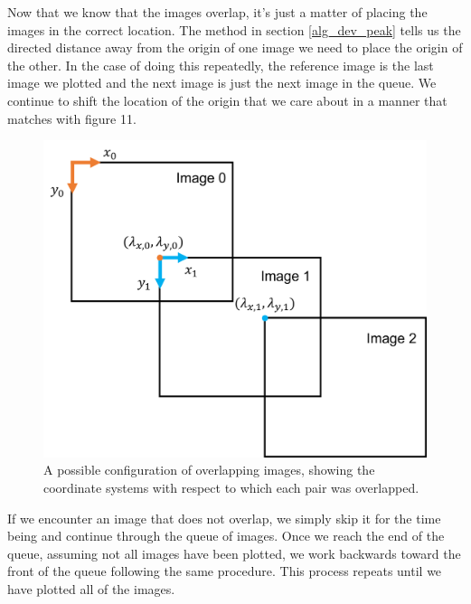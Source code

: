 \documentclass[]{article}
\begin{document}
Now that we know that the images overlap, it's just a matter of placing the images in the correct location. The method in section \ref{alg_dev_peak} tells us the directed distance away from the origin of one image we need to place the origin of the other. In the case of doing this repeatedly, the reference image is the last image we plotted and the next image is just the next image in the queue. We continue to shift the location of the origin that we care about in a manner that matches with figure 11.

\begin{figure}[H]
	\centering
	\label{coord_sys}
	\includegraphics[width=5in]{coord_sys.png}
	\caption{A possible configuration of overlapping images, showing the coordinate systems with respect to which each pair was overlapped.}
\end{figure}

If we encounter an image that does not overlap, we simply skip it for the time being and continue through the queue of images. Once we reach the end of the queue, assuming not all images have been plotted, we work backwards toward the front of the queue following the same procedure. This process repeats until we have plotted all of the images. 
\end{document}
